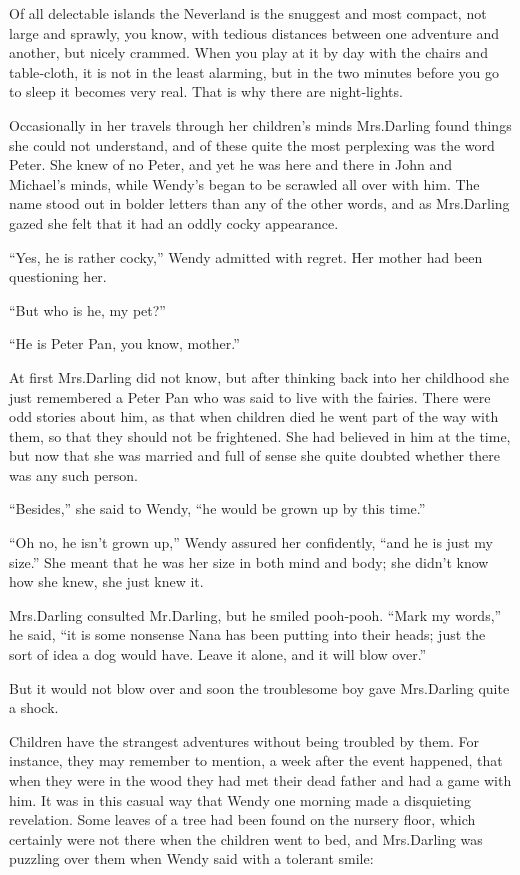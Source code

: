 Of all delectable islands the Neverland is the snuggest and most compact,
not large and sprawly, you know, with tedious distances between one adventure and another,
but nicely crammed.
When you play at it by day with the chairs and table‐cloth, it is not in the least alarming,
but in the two minutes before you go to sleep it becomes very real.
That is why there are night‐lights.

Occasionally in her travels through her children’s minds Mrs.\@ Darling found things she could not understand,
and of these quite the most perplexing was the word Peter.
She knew of no Peter, and yet he was here and there in John and Michael’s minds,
while Wendy’s began to be scrawled all over with him.
The name stood out in bolder letters than any of the other words,
and as Mrs.\@ Darling gazed she felt that it had an oddly cocky appearance.

“Yes, he is rather cocky,” Wendy admitted with regret.
Her mother had been questioning her.

“But who is he, my pet?”

“He is Peter Pan, you know, mother.”

At first Mrs.\@ Darling did not know,
but after thinking back into her childhood she just remembered a Peter Pan who was said to live with the fairies.
There were odd stories about him,
as that when children died he went part of the way with them, so that they should not be frightened.
She had believed in him at the time,
but now that she was married and full of sense she quite doubted whether there was any such person.

“Besides,” she said to Wendy, “he would be grown up by this time.”

“Oh no, he isn’t grown up,” Wendy assured her confidently, “and he is just my size.”
She meant that he was her size in both mind and body;
she didn’t know how she knew, she just knew it.

Mrs.\@ Darling consulted Mr.\@ Darling, but he smiled pooh‐pooh.
“Mark my words,” he said, “it is some nonsense Nana has been putting into their heads;
just the sort of idea a dog would have.
Leave it alone, and it will blow over.”

But it would not blow over and soon the troublesome boy gave Mrs.\@ Darling quite a shock.

Children have the strangest adventures without being troubled by them.
For instance, they may remember to mention, a week after the event happened,
that when they were in the wood they had met their dead father and had a game with him.
It was in this casual way that Wendy one morning made a disquieting revelation.
Some leaves of a tree had been found on the nursery floor,
which certainly were not there when the children went to bed,
and Mrs.\@ Darling was puzzling over them when Wendy said with a tolerant smile:

